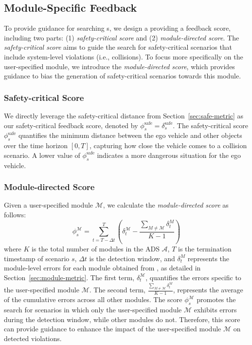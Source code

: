 \subsection{Module-Specific Feedback} %

To provide guidance for searching {\mccs}s, we design a \feedback providing a feedback score, including two parts: (1) \textit{safety-critical score} and (2) \textit{module-directed score}. The \textit{safety-critical score} aims to guide the search for safety-critical scenarios that include system-level violations (i.e., collisions). To focus more specifically on the user-specified module, we introduce the \textit{module-directed score}, which provides guidance to bias the generation of safety-critical scenarios towards this module.


\subsubsection{Safety-critical Score}
We directly leverage the safety-critical distance from Section~\ref{sec:safe-metric} as our safety-critical feedback score, denoted by \( \phi_{s}^{\text{safe}} = \delta^{\text{safe}}_{s} \).
The safety-critical score \(\phi_{s}^{\text{safe}}\) quantifies the minimum distance between the ego vehicle and other objects over the time horizon \([0, T]\), capturing how close the vehicle comes to a collision scenario. A lower value of \(\phi_{s}^{\text{safe}}\) indicates a more dangerous situation for the ego vehicle.


\subsubsection{Module-directed Score} 
Given a user-specified module \( \mathcal{M} \), we calculate the \textit{module-directed score} as follows:
\begin{equation}
    \phi_{s}^{\mathcal{M}} = \sum_{t=T-\Delta t}^{T}\left( \delta_t^{\mathcal{M}} - \frac{\sum_{M \neq \mathcal{M}} \delta_t^{{M}}}{K - 1} \right)
\end{equation}
where \( K \) is the total number of modules in the ADS \(\mathcal{A}\), \( T \) is the termination timestamp of scenario \( s \), \( \Delta t \) is the detection window, and \( \delta_t^{{M}} \) represents the module-level errors for each module obtained from \oracle, as detailed in Section~\ref{sec:module-metric}. 
The first term, \( \delta_t^{\mathcal{M}} \), quantifies the errors specific to the user-specified module \( \mathcal{M} \). 
The second term, \( \frac{\sum_{M \neq \mathcal{M}} \delta_t^{{M}}}{K - 1} \), represents the average of the cumulative errors across all other modules. 
The score \( \phi_{s}^{\mathcal{M}} \) promotes the search for scenarios in which only the user-specified module \( \mathcal{M} \) exhibits errors during the detection window, while other modules do not. Therefore, this score can provide guidance to enhance the impact of the user-specified module \( \mathcal{M} \) on detected violations.


